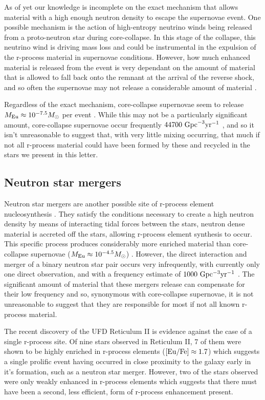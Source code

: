 \documentclass[a4paper,fleqn,usenatbib]{mnras}
\begin{document}
	As of yet our knowledge is incomplete on the exact mechanism that allows material with a high enough neutron density to escape the supernovae event.
	One possible mechanism is the action of high-entropy neutrino winds being released from a proto-neutron star during core-collapse. In this stage of the collapse, this neutrino wind is driving mass loss and could be instrumental in the expulsion of the r-process material in supernovae conditions. However, how much enhanced material is released from the event is very dependant on the amount of material that is allowed to fall back onto the remnant at the arrival of the reverse shock, and so often the supernovae may not release a considerable amount of material \citep{Woosley1992, Burrows1995}. 
	
	Regardless of the exact mechanism, core-collapse supernovae seem to release $M_{\rm{Eu}}\approx10^{-7.5} M_{\odot}$ per event \citep{Argast2004} . While this may not be a particularly significant amount, core-collapse supernovae occur frequently $44700\ \rm{Gpc}^{-3} \rm{yr^{-1}}$ \citep{Li2011}, and so it isn't unreasonable to suggest that, with very little mixing occurring, that much if not all r-process material could have been formed by these and recycled in the stars we present in this letter.
	
	\subsection{Neutron star mergers}
	\label{NSmerg}
	Neutron star mergers are another possible site of r-process element nucleosynthesis \citep{Kasen2017,Hotok2013,Drout2017}. They satisfy the conditions necessary to create a high neutron density by means of interacting tidal forces between the stars, neutron dense material is accreted off the stars, allowing r-process element synthesis to occur. This specific process produces considerably more enriched material than core-collapse supernovae ($M_{\rm{Eu}}\approx10^{-4.5} M_{\odot}$) \citep{Goriely2011}. However, the direct interaction and merger of a binary neutron star pair occurs very infrequently, with currently only one direct observation, and with a frequency estimate of $1000\ \rm{Gpc^{-3}yr^{-1}}$ \citep{LIGO2016}. The significant amount of material that these mergers release can compensate for their low frequency and so, synonymous with core-collapse supernovae, it is not unreasonable to suggest that they are responsible for most if not all known r-process material. 

	The recent discovery of the UFD Reticulum II \citep{Ji2016} is evidence against the case of a single r-process site. Of nine stars observed in Reticulum II, 7 of them were shown to be highly enriched in r-process elements ($\rm{[Eu/Fe]\approx1.7}$) which suggests a single prolific event having occurred in close proximity to the galaxy early in it's formation, such as a neutron star merger. However, two of the stars observed were only weakly enhanced in r-process elements which suggests that there must have been a second, less efficient, form of r-process enhancement present.
	
\end{document}
